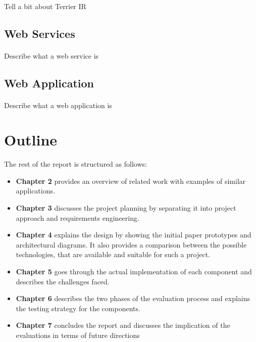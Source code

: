 \documentclass{l4proj}
\begin{document}
\paragraph{}
Tell a bit about Terrier IR

\subsection{Web Services}
\paragraph{}
Describe what a web service is

\subsection{Web Application}
\paragraph{}
Describe what a web application is

\section{Outline}
The rest of the report is structured as follows:
\begin{itemize}
	\item \textbf{Chapter 2} provides an overview of related work with examples of similar applications.
	
	\item \textbf{Chapter 3} discusses the project planning by separating it into project approach and requirements engineering.
	\item \textbf{Chapter 4} explains the design by showing the initial paper prototypes and architectural diagrams. It also provides a comparison between the possible technologies, that are available and suitable for such a project.
	\item \textbf{Chapter 5} goes through the actual implementation of each component and describes the challenges faced. 
	\item \textbf{Chapter 6} describes the two phases of the evaluation process and explains the testing strategy for the components.
	\item \textbf{Chapter 7} concludes the report and discusses the implication of the evaluations in terms of future directions
\end{itemize}
\end{document}
